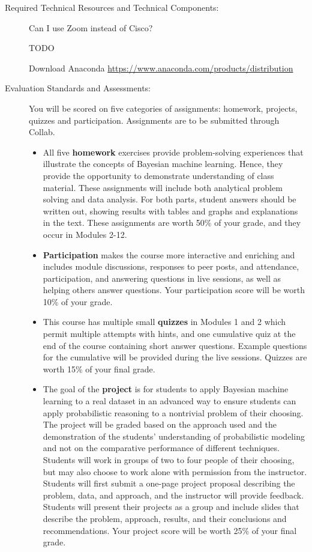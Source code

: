 \documentclass[11pt]{article}
\begin{document}
\begin{description}
\item[Required Technical Resources and Technical Components:]  

Can I use Zoom instead of Cisco?

TODO

Download Anaconda \url{https://www.anaconda.com/products/distribution}

\item[Evaluation Standards and Assessments:] 

You will be scored on five categories of assignments: homework, projects, quizzes and participation. Assignments are to be submitted through Collab. 

\begin{itemize}
\item All five {\bf homework} exercises provide problem-solving experiences that illustrate the concepts of Bayesian machine learning. Hence, they provide the opportunity to demonstrate understanding of class material. These assignments will include both analytical problem solving and data analysis. For both parts, student answers should be written out, showing results with tables and graphs and explanations in the text. These assignments are worth 50\% of your grade, and they occur in Modules 2-12.
\item {\bf Participation} makes the course more interactive and enriching and includes module discussions, responses to peer posts, and attendance, participation, and answering questions in live sessions, as well as helping others answer questions. Your participation score will be worth 10\% of your grade. 
\item This course has multiple small {\bf quizzes} in Modules 1 and 2 which permit multiple attempts with hints, and one cumulative quiz at the end of the course containing short answer questions. Example questions for the cumulative will be provided during the live sessions. Quizzes are worth 15\% of your final grade. 
\item The goal of the {\bf project} is for students to apply Bayesian machine learning to a real dataset in an advanced way to ensure students can apply probabilistic reasoning to a nontrivial problem of their choosing. The project will be graded based on the approach used and the demonstration of the students’ understanding of probabilistic modeling and not on the comparative performance of different techniques. Students will work in groups of two to four people of their choosing, but may also choose to work alone with permission from the instructor. Students will first submit a one-page project proposal describing the problem, data, and approach, and the instructor will provide feedback. Students will present their projects as a group and include slides that describe the problem, approach, results, and their conclusions and recommendations. Your project score will be worth 25\% of your final grade. 
\end{itemize}  


\end{description}
\end{document}
